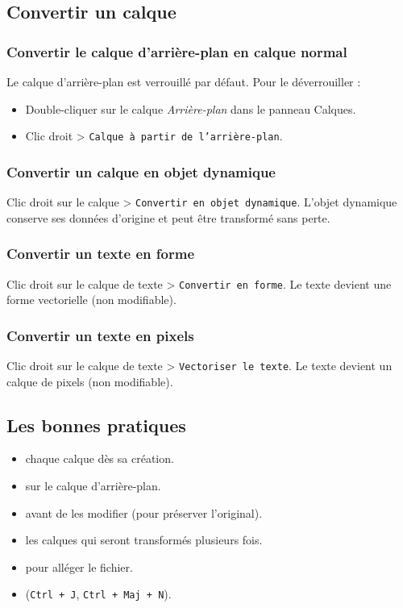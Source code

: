 \subsection{Convertir un calque}

\subsubsection{Convertir le calque d'arrière-plan en calque normal}

Le calque d'arrière-plan est verrouillé par défaut. Pour le déverrouiller :

\begin{itemize}
    \item Double-cliquer sur le calque \emph{Arrière-plan} dans le panneau Calques.
    \item Clic droit > \texttt{Calque à partir de l'arrière-plan}.
\end{itemize}

\subsubsection{Convertir un calque en objet dynamique}

Clic droit sur le calque > \texttt{Convertir en objet dynamique}. L'objet dynamique conserve ses données d'origine et peut être transformé sans perte.

\subsubsection{Convertir un texte en forme}

Clic droit sur le calque de texte > \texttt{Convertir en forme}. Le texte devient une forme vectorielle (non modifiable).

\subsubsection{Convertir un texte en pixels}

Clic droit sur le calque de texte > \texttt{Vectoriser le texte}. Le texte devient un calque de pixels (non modifiable).

\subsection{Les bonnes pratiques}

\begin{itemize}
    \item {} chaque calque dès sa création.
    \item {} sur le calque d'arrière-plan.
    \item {} avant de les modifier (pour préserver l'original).
    \item {} les calques qui seront transformés plusieurs fois.
    \item {} pour alléger le fichier.
    \item {} (\texttt{Ctrl + J}, \texttt{Ctrl + Maj + N}).
\end{itemize}

